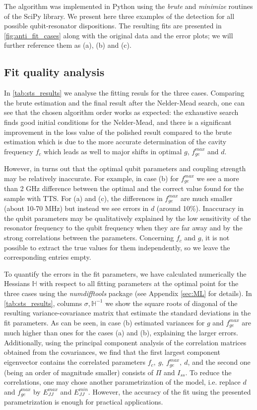 \documentclass[%
 aip,
 draft,
 amsmath,amssymb,
 reprint,%
]{revtex4-1}
\begin{document}
The algorithm was implemented in Python using the \textit{brute} and \textit{minimize} routines of the SciPy\cite{scipy} library. We present here three examples of the detection for all possible qubit-resonator dispositions.  The resulting fits are presented in \autoref{fig:anti_fit_cases} along with the original data and the error plots; we will further reference them as (a), (b) and (c).

\subsection{Fit quality analysis} 

In \autoref{tab:sts_results} we analyse the fitting resuls for the three cases. Comparing the brute estimation and the final result after the Nelder-Mead search, one can see that the chosen algorithm order works as expected: the exhaustive search finds good initial conditions for the Nelder-Mead, and there is a significant improvement in the loss value of the polished result compared to the brute estimation which is due to the more accurate determination of the cavity frequency $f_c$ which leads as well to major shifts in optimal $g$, $f_{ge}^{max}$ and $d$.

However, in turns out that the optimal qubit parameters and coupling strength may be relatively inaccurate. For example, in case (b) for $f_{ge}^{max}$ we see a more than 2 GHz difference between the optimal and the correct value found for the sample with TTS. For (a) and (c), the differences in $f_{ge}^{max}$ are much smaller (about 10-70 MHz) but instead we see errors in $d$ (around 10\%). Inaccuracy in the qubit parameters may be qualitatively explained by the low sensitivity of the resonator frequency to the qubit frequency when they are far away and by the strong correlations between the parameters. Concerning $f_c$ and $g$, it is not possible to extract the true values for them independently, so we leave the corresponding entries empty.

To quantify the errors in the fit parameters, we have calculated numerically the Hessians $\mathbb{H}$ with respect to all fitting parameters at the optimal point for the three cases using the \textit{numdifftools}\cite{numdifftools} package (see Appendix \ref{sec:ML} for details). In \autoref{tab:sts_results}, columns $\sigma, \mathbb{H}^{-1}$ we show the square roots of diagonal of the resulting variance-covariance matrix that estimate the standard deviations in the fit parameters. As can be seen, in case (b) estimated variances for $g$ and $f_{ge}^{max}$ are much higher than ones for the cases (a) and (b), explaining the larger errors. Additionally, using the principal component analysis of the correlation matrices obtained from the covariances, we find that the first largest component eigenvector contains the correlated parameters $f_c,\ g,\ f_{ge}^{max},\ d$, and the second one (being an order of magnitude smaller) consists of $\Pi$ and $I_{ss}$. To reduce the correlations, one may chose another parametrization of the model, i.e. replace $d$ and $f_{ge}^{max}$ by $ E_{JJ}^{max} $ and $ E_{JJ}^{min} $. However, the accuracy of the fit using the presented parametrization is enough for practical applications.
\end{document}
